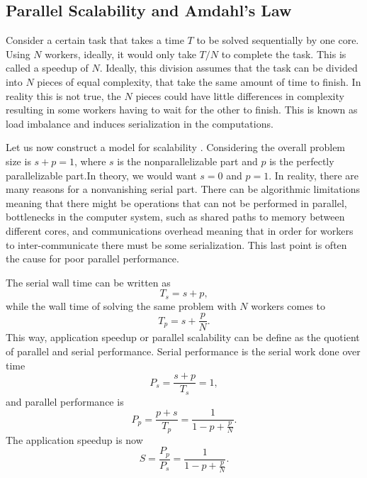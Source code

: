\subsection{Parallel Scalability and Amdahl's Law}

	Consider a certain task that takes a time $T$ to be solved sequentially by one core. Using $N$ workers, ideally, it would only take $T / N$ to complete the task. This is called a speedup of $N$. Ideally, this division assumes that the task can be divided into $N$ pieces of equal complexity, that take the same amount of time to finish. In reality this is not true, the $N$ pieces could have little differences in complexity resulting in some workers having to wait for the other to finish. This is known as load imbalance and induces serialization in the computations.
	
	Let us now construct a model for scalability \cite{Hager2011}. Considering the overall problem size is $s + p = 1$, where $s$ is the nonparallelizable part and $p$ is the perfectly parallelizable part.In theory, we would want $s=0$ and $p=1$. In reality, there are many reasons for a nonvanishing serial part. There can be algorithmic limitations meaning that there might be operations that can not be performed in parallel, bottlenecks in the computer system, such as shared paths to memory between different cores, and communications overhead meaning that in order for workers to inter-communicate there must be some serialization. This last point is often the cause for poor parallel performance. 
		
	The serial wall time can be written as
\begin{equation}
	T_s = s + p,
\end{equation}	
while the wall time of solving the same problem with $N$ workers comes to
\begin{equation}
	T_p = s + \frac{p}{N}.
\end{equation}
This way, application speedup or parallel scalability can be define as the quotient of parallel and serial performance. Serial performance is the serial work done over time
\begin{equation}
	P_s = \frac{s+p}{T_s} = 1,
\end{equation} 
and parallel performance is
\begin{equation}
	P_p = \frac{p+s}{T_p} = \frac{1}{1-p+\frac{p}{N}}.
\end{equation}
The application speedup is now
\begin{equation}\label{eq:amd_law}
	S = \frac{P_p}{P_s} = \frac{1}{1-p+\frac{p}{N}}.
\end{equation}

